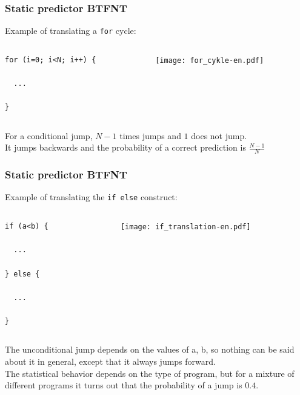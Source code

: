 \documentclass{beamer}
\begin{document}
\begin{frame}[fragile]
\frametitle{Static predictor BTFNT}

Example of translating a \texttt{for} cycle:

\begin{columns}[T]
\begin{column}{0.4\textwidth}
\begin{verbatim}
for (i=0; i<N; i++) {

  ...
  
}
\end{verbatim}
\end{column}
\begin{column}{0.6\textwidth}
\texttt{[image: for\_cykle-en.pdf]}
\end{column}
\end{columns}
\bigskip
For a conditional jump, $N-1$ times jumps and $1$ does not jump.\\
It jumps backwards and the probability of a correct prediction is $\frac{N-1}{N}$

\end{frame}

\begin{frame}[fragile]
\frametitle{Static predictor BTFNT}

Example of translating the \texttt{if else} construct:

\begin{columns}[T]
\begin{column}{0.4\textwidth}
\begin{verbatim}
if (a<b) {
  
  ...

} else {

  ...

}
\end{verbatim}
\end{column}
\begin{column}{0.6\textwidth}
\texttt{[image: if\_translation-en.pdf]}
\end{column}
\end{columns}
\bigskip
The unconditional jump depends on the values of a, b, so nothing can be said about it in general, except that it always jumps forward.\\
The statistical behavior depends on the type of program, but for a mixture of different programs it turns out that the probability of a jump is $0.4$.

\end{frame}
\end{document}
